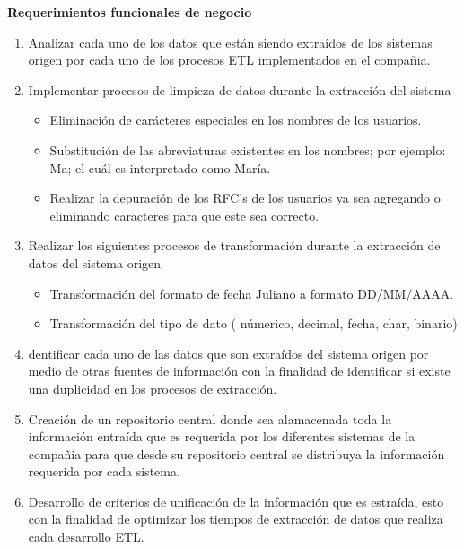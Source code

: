 \textbf{Requerimientos funcionales de negocio}

\begin{enumerate}

\item Analizar cada uno de los datos que están siendo extraídos de los sistemas
  origen por cada uno de los procesos ETL implementados en el compañia.

\item Implementar procesos de limpieza de datos durante la extracción del
  sistema

  \begin {itemize}
  \item Eliminación de carácteres especiales en los nombres de los usuarios.
  \item Substitución de las abreviaturas existentes en los nombres; por ejemplo:
    Ma; el cuál es interpretado como María.
  \item Realizar la depuración de los RFC's de los usuarios ya sea agregando o
    eliminando caracteres para que este sea correcto.
  \end{itemize}

\item Realizar los siguientes procesos de transformación durante la extracción de datos del sistema origen

  \begin {itemize}
  \item Transformación del formato de fecha Juliano a formato DD/MM/AAAA.
  \item Transformación del tipo de dato ( númerico, decimal, fecha, char,
    binario)
  \end{itemize}

\item dentificar cada uno de las datos que son extraídos del sistema origen por
  medio de otras fuentes de información con la finalidad de identificar si
  existe una duplicidad en los procesos de extracción.

\item Creación de un repositorio central donde sea alamacenada toda la
  información entraída que es requerida por los diferentes sistemas de la
  compañia para que desde su repositorio central se distribuya la información
  requerida por cada sistema.

\item Desarrollo de criterios de unificación de la información que es estraída,
  esto con la finalidad de optimizar los tiempos de extracción de datos que
  realiza cada desarrollo ETL.


\end{enumerate}
